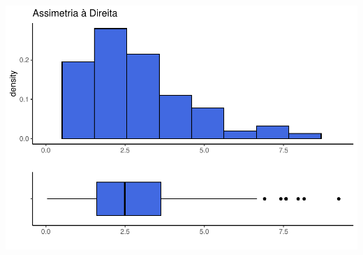 \documentclass[
]{book}
\begin{document}
\begin{center}\includegraphics{AED_files/figure-latex/assimetriaD-1} \end{center}
\end{document}
